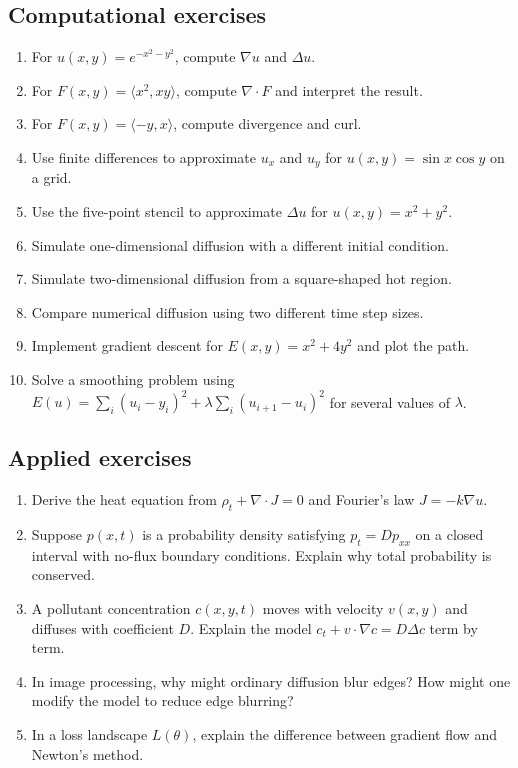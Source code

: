 \documentclass[11pt]{article}
\newcommand{\grad}{\nabla}
\newcommand{\Div}{\nabla\!\cdot}
\newcommand{\Lap}{\Delta}
\begin{document}
\subsection*{Computational exercises}
\begin{enumerate}[start=11]
  \item For $u(x,y)=e^{-x^2-y^2}$, compute $\grad u$ and $\Lap u$.
  \item For $F(x,y)=\langle x^2,xy\rangle$, compute $\Div F$ and interpret the result.
  \item For $F(x,y)=\langle -y,x\rangle$, compute divergence and curl.
  \item Use finite differences to approximate $u_x$ and $u_y$ for $u(x,y)=\sin x\cos y$ on a grid.
  \item Use the five-point stencil to approximate $\Lap u$ for $u(x,y)=x^2+y^2$.
  \item Simulate one-dimensional diffusion with a different initial condition.
  \item Simulate two-dimensional diffusion from a square-shaped hot region.
  \item Compare numerical diffusion using two different time step sizes.
  \item Implement gradient descent for $E(x,y)=x^2+4y^2$ and plot the path.
  \item Solve a smoothing problem using $E(u)=\sum_i(u_i-y_i)^2+\lambda\sum_i(u_{i+1}-u_i)^2$ for several values of $\lambda$.
\end{enumerate}

\subsection*{Applied exercises}
\begin{enumerate}[start=21]
  \item Derive the heat equation from $\rho_t+\Div J=0$ and Fourier's law $J=-k\grad u$.
  \item Suppose $p(x,t)$ is a probability density satisfying $p_t=Dp_{xx}$ on a closed interval with no-flux boundary conditions. Explain why total probability is conserved.
  \item A pollutant concentration $c(x,y,t)$ moves with velocity $v(x,y)$ and diffuses with coefficient $D$. Explain the model $c_t+v\cdot\grad c=D\Lap c$ term by term.
  \item In image processing, why might ordinary diffusion blur edges? How might one modify the model to reduce edge blurring?
  \item In a loss landscape $L(\theta)$, explain the difference between gradient flow and Newton's method.
\end{enumerate}
\end{document}
